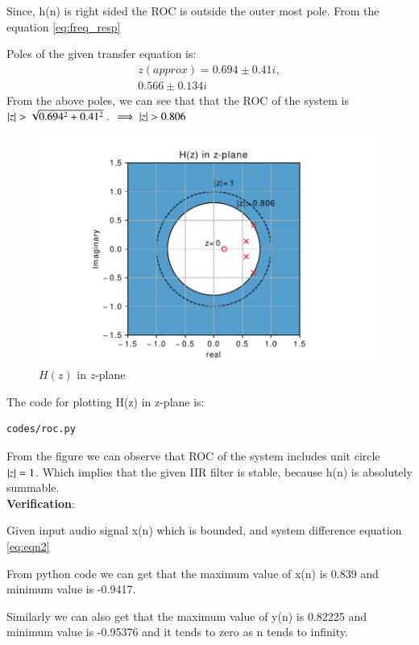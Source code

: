 \documentclass[journal,12pt,twocolumn]{IEEEtran}
\renewcommand\thesection{\arabic{section}}
\begin{document}
\begin{enumerate}[label=\thesection.\arabic*,ref=\thesection.\theenumi]
Since, h(n) is right sided the ROC is outside the outer most pole. From the equation \eqref{eq:freq_resp}

Poles of the given transfer equation is:
\begin{equation}
\begin{split}
z(approx) = 0.694 \pm 0.41i,
\\
 0.566 \pm 0.134i
\end{split}  
\end{equation}
From the above poles, we can see that that the ROC of the system is $\left\vert z\right\vert>\sqrt{0.694^{2}+0.41^{2}}$.
$\implies \left\vert z\right\vert > 0.806$
\\
\begin{figure}[!ht]
\centering
\includegraphics[width=\columnwidth]{./figs/roc}
\caption{$H(z)$ in $z$-plane}
\label{fig:xnhnfft}
\end{figure}

The code for plotting H(z) in z-plane is:
\begin{lstlisting}
codes/roc.py
\end{lstlisting}

From the figure we can observe that ROC of the system includes unit circle $\left\vert z\right\vert=1$.
Which implies that the given IIR filter is stable, because h(n) is absolutely summable.
\\
\textbf{Verification}:

Given input audio signal x(n) which is bounded, and system difference equation \ref{eq:eqn2}

From python code we can get that the maximum value of x(n) is 0.839 and minimum value is -0.9417.

Similarly we can also get that the maximum value of y(n) is 0.82225 and minimum value is -0.95376 and it tends to zero as n tends to infinity.


\end{enumerate}
\end{document}
